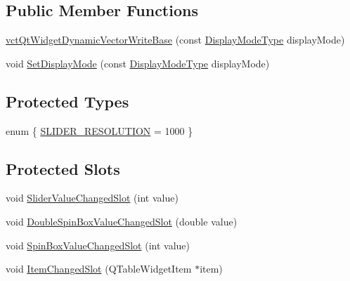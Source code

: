 \subsection*{Public Member Functions}
\begin{DoxyCompactItemize}
\item 
\hyperlink{classvct_qt_widget_dynamic_vector_write_base_a49b15da333730edfad46b2328a348584}{vct\+Qt\+Widget\+Dynamic\+Vector\+Write\+Base} (const \hyperlink{classvct_qt_widget_dynamic_vector_write_base_aefbf6a51f1009f060305c2b5e106cf02}{Display\+Mode\+Type} display\+Mode)
\item 
void \hyperlink{classvct_qt_widget_dynamic_vector_write_base_a19cef1a736f0414393788ccf7b58175f}{Set\+Display\+Mode} (const \hyperlink{classvct_qt_widget_dynamic_vector_write_base_aefbf6a51f1009f060305c2b5e106cf02}{Display\+Mode\+Type} display\+Mode)
\end{DoxyCompactItemize}
\subsection*{Protected Types}
\begin{DoxyCompactItemize}
\item 
enum \{ \hyperlink{classvct_qt_widget_dynamic_vector_write_base_a2bae677048cad1441ab937cb78737743ab508a86bc91e13c000f3634a96f7b44f}{S\+L\+I\+D\+E\+R\+\_\+\+R\+E\+S\+O\+L\+U\+T\+I\+O\+N} = 1000
 \}
\end{DoxyCompactItemize}
\subsection*{Protected Slots}
\begin{DoxyCompactItemize}
\item 
void \hyperlink{classvct_qt_widget_dynamic_vector_write_base_a850f1037fe95f4d8467313d7713b1d0d}{Slider\+Value\+Changed\+Slot} (int value)
\item 
void \hyperlink{classvct_qt_widget_dynamic_vector_write_base_aad8ccc0aba1b519bdfff00a5a5e88586}{Double\+Spin\+Box\+Value\+Changed\+Slot} (double value)
\item 
void \hyperlink{classvct_qt_widget_dynamic_vector_write_base_a41430617cff519ef7e20b5e19f412266}{Spin\+Box\+Value\+Changed\+Slot} (int value)
\item 
void \hyperlink{classvct_qt_widget_dynamic_vector_write_base_a112558c2b4bc69ace11c8fc59534ddce}{Item\+Changed\+Slot} (Q\+Table\+Widget\+Item $\ast$item)
\end{DoxyCompactItemize}
